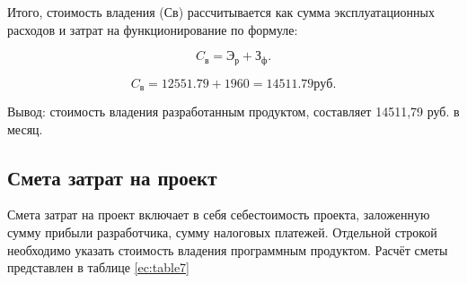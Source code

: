 
Итого, стоимость владения (Св) рассчитывается как сумма
эксплуатационных расходов и затрат на функционирование по формуле:

\begin{equation}
    C_\text{в} = \text{Э}_\text{р} + \text{З}_\text{ф}.
\end{equation}

\begin{equation*}
    C_\text{в} = 12551.79 + 1960 = 14511.79 руб.
\end{equation*}

Вывод: стоимость владения разработанным продуктом, составляет 14511,79 руб. в месяц.

\subsection{Смета затрат на проект}

Смета затрат на проект включает в себя себестоимость проекта,
заложенную сумму прибыли разработчика, сумму налоговых платежей.
Отдельной строкой необходимо указать стоимость владения программным
продуктом. Расчёт сметы представлен в таблице \ref{ec:table7}

